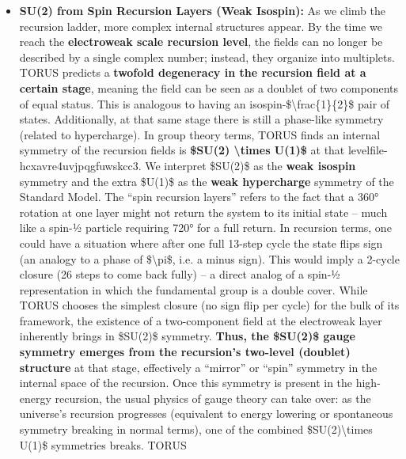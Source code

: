 \documentclass[
]{article}
\begin{document}
{\begin{itemize}
  This is a proof-of-concept that the mere existence of the closed
  recursion yields electromagnetism's gauge symmetry.
\item
  \textbf{SU(2) from Spin Recursion Layers (Weak Isospin):} As we climb
  the recursion ladder, more complex internal structures appear. By the
  time we reach the \textbf{electroweak scale recursion level}, the
  fields can no longer be described by a single complex number; instead,
  they organize into multiplets. TORUS predicts a \textbf{twofold
  degeneracy in the recursion field at a certain stage}, meaning the
  field can be seen as a doublet of two components of equal
  status\hspace{0pt}. This is analogous to having an
  isospin-\$\textbackslash frac\{1\}\{2\}\$ pair of states.
  Additionally, at that same stage there is still a phase-like symmetry
  (related to hypercharge). In group theory terms, TORUS finds an
  internal symmetry of the recursion fields is \textbf{\$SU(2)
  \textbackslash times U(1)\$} at that
  level\hspace{0pt}file-hcxavre4uvjpqgfuwskcc3. We interpret \$SU(2)\$
  as the \textbf{weak isospin} symmetry and the extra \$U(1)\$ as the
  \textbf{weak hypercharge} symmetry of the Standard Model. The ``spin
  recursion layers'' refers to the fact that a 360° rotation at one
  layer might not return the system to its initial state -- much like a
  spin-½ particle requiring 720° for a full return. In recursion terms,
  one could have a situation where after one full 13-step cycle the
  state flips sign (an analogy to a phase of \$\textbackslash pi\$, i.e.
  a minus sign)\hspace{0pt}. This would imply a 2-cycle closure (26
  steps to come back fully) -- a direct analog of a spin-½
  representation in which the fundamental group is a double cover. While
  TORUS chooses the simplest closure (no sign flip per cycle) for the
  bulk of its framework, the existence of a two-component field at the
  electroweak layer inherently brings in \$SU(2)\$ symmetry.
  \textbf{Thus, the \$SU(2)\$ gauge symmetry emerges from the
  recursion's two-level (doublet) structure} at that stage, effectively
  a ``mirror'' or ``spin'' symmetry in the internal space of the
  recursion\hspace{0pt}. Once this symmetry is present in the
  high-energy recursion, the usual physics of gauge theory can take
  over: as the universe's recursion progresses (equivalent to energy
  lowering or spontaneous symmetry breaking in normal terms), one of the
  combined \$SU(2)\textbackslash times U(1)\$ symmetries breaks. TORUS

\end{itemize}}
\end{document}
